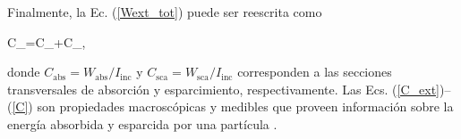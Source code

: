  \noindent Finalmente, la Ec. (\ref{Wext_tot}) puede ser reescrita como \cite{bohrenAbsorptionScatteringLight2008}
%
\begin{tcolorbox}
	C_{}=C_{}+C_{},
	\label{C} 
\end{tcolorbox}
%
\noindent donde $C_{\text{abs}}=W_{\text{abs}}/I_{\text{inc}}$ y $C_{\text{sca}}=W_{\text{sca}}/I_{\text{inc}}$ corresponden a las secciones transversales de absorción y esparcimiento, respectivamente.
Las Ecs. (\ref{C_ext})--(\ref{C}) son propiedades macroscópicas y medibles que proveen información sobre la energía absorbida y esparcida por una partícula \cite{bohrenAbsorptionScatteringLight2008}.  \\

